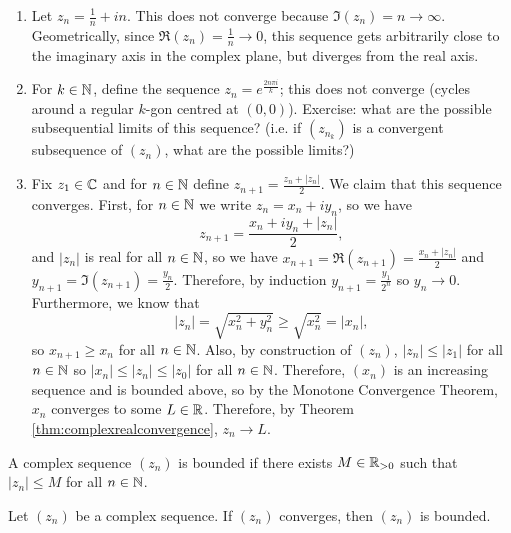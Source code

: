 \documentclass[../analysis1.tex]{subfiles}
\begin{document}
\begin{example}
    \begin{enumerate}
        \item[1.] Let $z_n=\frac{1}{n}+in$. This does not converge because $\Im(z_n)=n\to\infty$. Geometrically, since $\Re(z_n)=\frac{1}{n}\to 0$, this sequence gets arbitrarily close to the imaginary axis in the complex plane, but diverges from the real axis.
        \item[2.] For $k\in\mathbb{N}$, define the sequence $z_n=e^{\frac{2n\pi i}{k}}$; this does not converge (cycles around a regular $k$-gon centred at $(0,0)$). Exercise: what are the possible subsequential limits of this sequence? (i.e. if $(z_{n_k})$ is a convergent subsequence of $(z_n)$, what are the possible limits?)
        \item[3.] Fix $z_1\in \mathbb{C}$ and for $n\in\mathbb{N}$ define $z_{n+1}=\frac{z_n+|z_n|}{2}$. We claim that this sequence converges. First, for $n\in\mathbb{N}$ we write $z_n=x_n+iy_n$, so we have $$z_{n+1}=\frac{x_n+iy_n+|z_n|}{2},$$and $|z_n|$ is real for all $n\in\mathbb{N}$, so we have $x_{n+1}=\Re(z_{n+1})=\frac{x_n+|z_n|}{2}$ and $y_{n+1}=\Im(z_{n+1})=\frac{y_n}{2}$. Therefore, by induction $y_{n+1}=\frac{y_1}{2^n}$ so $y_n\to 0$. Furthermore, we know that $$|z_n|=\sqrt{x_n^2+y_n^2}\ge \sqrt{x_n^2}=|x_n|,$$so $x_{n+1}\ge x_n$ for all $n\in\mathbb{N}$. Also, by construction of $(z_n)$, $|z_n|\le |z_1|$ for all $n\in\mathbb{N}$ so $|x_n|\le |z_n|\le |z_0|$ for all $n\in\mathbb{N}$. Therefore, $(x_n)$ is an increasing sequence and is bounded above, so by the Monotone Convergence Theorem, $x_n$ converges to some $L\in\mathbb{R}$. Therefore, by Theorem \ref{thm:complexrealconvergence}, $z_n\to L$.
    \end{enumerate}
\end{example}



\begin{definition}
    \begin{shaded*}
        A complex sequence $(z_n)$ is bounded if there exists $M\in \mathbb{R}_{>0}$ such that $|z_n|\le M$ for all $n\in\mathbb{N}$.
    \end{shaded*}
\end{definition}

\begin{theorem}
    \begin{shaded*}
        Let $(z_n)$ be a complex sequence. If $(z_n)$ converges, then $(z_n)$ is bounded.
    \end{shaded*}
\end{theorem}
\end{document}

